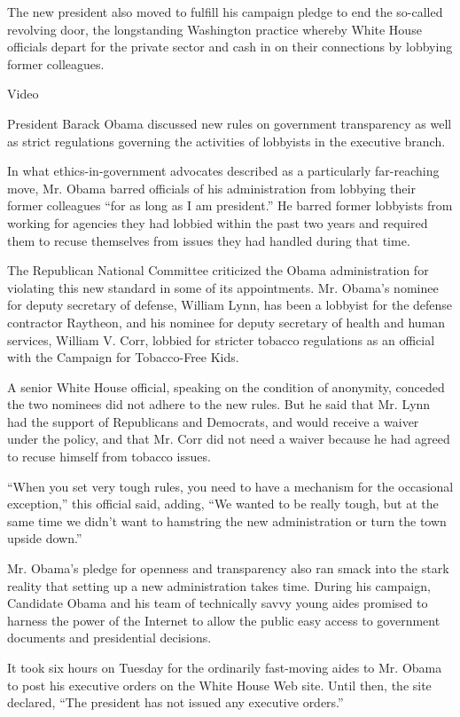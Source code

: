 The new president also moved to fulfill his campaign pledge to end the
so-called revolving door, the longstanding Washington practice whereby
White House officials depart for the private sector and cash in on their
connections by lobbying former colleagues.

Video

President Barack Obama discussed new rules on government transparency as
well as strict regulations governing the activities of lobbyists in the
executive branch.

In what ethics-in-government advocates described as a particularly
far-reaching move, Mr. Obama barred officials of his administration from
lobbying their former colleagues ``for as long as I am president.'' He
barred former lobbyists from working for agencies they had lobbied
within the past two years and required them to recuse themselves from
issues they had handled during that time.

The Republican National Committee criticized the Obama administration
for violating this new standard in some of its appointments. Mr. Obama's
nominee for deputy secretary of defense, William Lynn, has been a
lobbyist for the defense contractor Raytheon, and his nominee for deputy
secretary of health and human services, William V. Corr, lobbied for
stricter tobacco regulations as an official with the Campaign for
Tobacco-Free Kids.

A senior White House official, speaking on the condition of anonymity,
conceded the two nominees did not adhere to the new rules. But he said
that Mr. Lynn had the support of Republicans and Democrats, and would
receive a waiver under the policy, and that Mr. Corr did not need a
waiver because he had agreed to recuse himself from tobacco issues.

``When you set very tough rules, you need to have a mechanism for the
occasional exception,'' this official said, adding, ``We wanted to be
really tough, but at the same time we didn't want to hamstring the new
administration or turn the town upside down.''

Mr. Obama's pledge for openness and transparency also ran smack into the
stark reality that setting up a new administration takes time. During
his campaign, Candidate Obama and his team of technically savvy young
aides promised to harness the power of the Internet to allow the public
easy access to government documents and presidential decisions.

It took six hours on Tuesday for the ordinarily fast-moving aides to Mr.
Obama to post his executive orders on the White House Web site. Until
then, the site declared, ``The president has not issued any executive
orders.''


